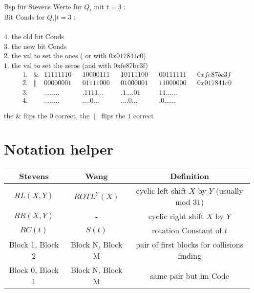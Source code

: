 Bsp für Stevens Werte für $Q_t$ mit $t = 3$ :\\
Bit Conds for $Q_t | t =3$ :\\
\\
$4.$ the old bit Conds\\
$3.$ the new bit Conds\\
$2.$ the val to set the ones ( or with $0x017841c0$)\\
$1.$ the val to set the zeros (and with 0xfe87bc3f)\\

\begin{align*}    
    1.& \& & 11111110 & & 10000111 & & 10111100 & & 00111111 & & 0xfe87bc3f \\
    2.& \| & 00000001 & & 01111000 & & 01000001 & & 11000000 & & 0x017841c0 \\
    3.&    & ........ & & .1111... & & .1....01 & & 11...... & &  \\
    4.&    & ........ & & ....0... & & ....0... & & .0...... & &  
\end{align*}

  the $\&$ flips the $0$ correct, the $\|$ flips the $1$ correct


  \newpage

\section{Notation helper}


\begin{table}[]
    \begin{tabular}{ c | c | c }
    Stevens & Wang  & Definition  \\
    \hline 
    $ RL \left(X , Y \right) $  & $ ROTL^{Y} \left( X\right) $  & cyclic left shift $X$ by $Y$ (usually mod 31) \\
    $ RR \left(X , Y \right) $  & -                             & cyclic right shift $X$ by $Y$  \\
    $ RC \left(t \right) $      &$ S \left(t \right) $          & rotation Constant of $t$ \\
    Block 1, Block 2 & Block N, Block M & pair of first blocks for collisions finding   \\
    Block 0, Block 1 & Block N, Block M & same pair but im Code\\
    \end{tabular}
\end{table}

